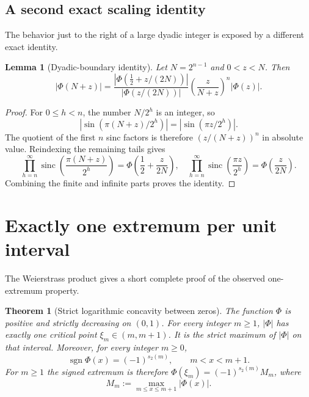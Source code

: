 \documentclass[11pt,oneside]{article}
\newtheorem{theorem}{Theorem}[section]
\newtheorem{lemma}[lemma]{Lemma}
\theoremstyle{definition}
\theoremstyle{remark}
\newcommand{\sinc}{\operatorname{sinc}}
\newcommand{\Phiup}{\Phi}
\newcommand{\sgn}{\operatorname{sgn}}
\newcommand{\abs}[1]{\left|#1\right|}
\begin{document}
\subsection{A second exact scaling identity}
\label{subsec:boundary-identity}

The behavior just to the right of a large dyadic integer is exposed by a different exact
identity.

\begin{lemma}[Dyadic-boundary identity]
\label{lem:dyadic-boundary}
Let $N=2^{n-1}$ and $0<z<N$.  Then
\begin{equation}
 \abs{\Phiup(N+z)}
 =\frac{\abs{\Phiup(\tfrac12+z/(2N))}}
        {\abs{\Phiup(z/(2N))}}
  \left(\frac{z}{N+z}\right)^n\abs{\Phiup(z)}.
 \label{eq:dyadic-boundary}
\end{equation}
\end{lemma}

\begin{proof}
For $0\le h<n$, the number $N/2^h$ is an integer, so
\[
 \abs{\sin(\pi(N+z)/2^h)}=\abs{\sin(\pi z/2^h)}.
\]
The quotient of the first $n$ sinc factors is therefore $(z/(N+z))^n$ in absolute value.
Reindexing the remaining tails gives
\[
 \prod_{h=n}^{\infty}\sinc\!\left(\frac{\pi(N+z)}{2^h}\right)
 =\Phiup\!\left(\frac12+\frac{z}{2N}\right),
 \quad
 \prod_{h=n}^{\infty}\sinc\!\left(\frac{\pi z}{2^h}\right)
 =\Phiup\!\left(\frac{z}{2N}\right).
\]
Combining the finite and infinite parts proves the identity.
\end{proof}

\section{Exactly one extremum per unit interval}
\label{sec:extrema}

The Weierstrass product gives a short complete proof of the observed one-extremum property.

\begin{theorem}[Strict logarithmic concavity between zeros]
\label{thm:unique-extremum}
The function $\Phiup$ is positive and strictly decreasing on $(0,1)$.  For every integer
$m\ge1$, $\abs{\Phiup}$ has exactly one critical point
$\xi_m\in(m,m+1)$.  It is the strict maximum of $\abs{\Phiup}$ on that interval.  Moreover,
for every integer $m\ge0$,
\begin{equation}
 \sgn\Phiup(x)=(-1)^{s_2(m)},\qquad m<x<m+1.
 \label{eq:TM-sign}
\end{equation}
For $m\ge1$ the signed extremum is therefore
$\Phiup(\xi_m)=(-1)^{s_2(m)}M_m$, where
\[
 M_m:=\max_{m\le x\le m+1}\abs{\Phiup(x)}.
\]
\end{theorem}
\end{document}
